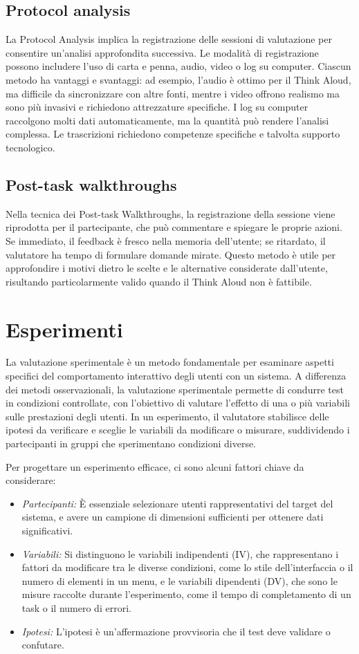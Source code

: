 \subsection{Protocol analysis}
La Protocol Analysis implica la registrazione delle sessioni di valutazione per consentire un’analisi approfondita successiva. Le modalità di registrazione possono includere l’uso di carta e penna, audio, video o log su computer. Ciascun metodo ha vantaggi e svantaggi: ad esempio, l’audio è ottimo per il Think Aloud, ma difficile da sincronizzare con altre fonti, mentre i video offrono realismo ma sono più invasivi e richiedono attrezzature specifiche. I log su computer raccolgono molti dati automaticamente, ma la quantità può rendere l’analisi complessa. Le trascrizioni richiedono competenze specifiche e talvolta supporto tecnologico.

\subsection{Post-task walkthroughs}
Nella tecnica dei Post-task Walkthroughs, la registrazione della sessione viene riprodotta per il partecipante, che può commentare e spiegare le proprie azioni. Se immediato, il feedback è fresco nella memoria dell’utente; se ritardato, il valutatore ha tempo di formulare domande mirate. Questo metodo è utile per approfondire i motivi dietro le scelte e le alternative considerate dall'utente, risultando particolarmente valido quando il Think Aloud non è fattibile.

\section{Esperimenti}
La valutazione sperimentale è un metodo fondamentale per esaminare aspetti specifici del comportamento interattivo degli utenti con un sistema. A differenza dei metodi osservazionali, la valutazione sperimentale permette di condurre test in condizioni controllate, con l'obiettivo di valutare l'effetto di una o più variabili sulle prestazioni degli utenti. In un esperimento, il valutatore stabilisce delle ipotesi da verificare e sceglie le variabili da modificare o misurare, suddividendo i partecipanti in gruppi che sperimentano condizioni diverse.

Per progettare un esperimento efficace, ci sono alcuni fattori chiave da considerare:
\begin{itemize}
    \item \textit{Partecipanti:} È essenziale selezionare utenti rappresentativi del target del sistema, e avere un campione di dimensioni sufficienti per ottenere dati significativi.
    \item \textit{Variabili:} Si distinguono le variabili indipendenti (IV), che rappresentano i fattori da modificare tra le diverse condizioni, come lo stile dell’interfaccia o il numero di elementi in un menu, e le variabili dipendenti (DV), che sono le misure raccolte durante l'esperimento, come il tempo di completamento di un task o il numero di errori.
    \item \textit{Ipotesi:} L'ipotesi è un'affermazione provvisoria che il test deve validare o confutare.
\end{itemize}

